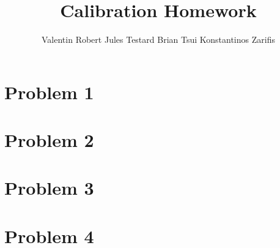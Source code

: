 \documentclass[11pt]{article}
\begin{document}
\title{Calibration Homework}
\author{Valentin Robert \quad Jules Testard \quad Brian Tsui \quad Konstantinos Zarifis}
\maketitle

\section*{Problem 1}



\section*{Problem 2}



\section*{Problem 3}



\section*{Problem 4}


\end{document}
